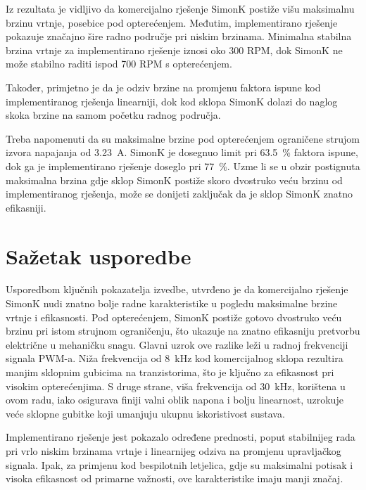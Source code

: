 \documentclass[diplomskirad]{fer}
\begin{document}
Iz rezultata je vidljivo da komercijalno rješenje SimonK postiže višu
maksimalnu brzinu vrtnje, posebice pod opterećenjem. Međutim, implementirano
rješenje pokazuje značajno šire radno područje pri niskim brzinama. Minimalna
stabilna brzina vrtnje za implementirano rješenje iznosi oko 300 RPM, dok
SimonK ne može stabilno raditi ispod 700 RPM s opterećenjem.

Također, primjetno je da je odziv brzine na promjenu faktora ispune kod
implementiranog rješenja linearniji, dok kod sklopa SimonK dolazi do naglog
skoka brzine na samom početku radnog područja.

Treba napomenuti da su maksimalne brzine pod opterećenjem ograničene strujom
izvora napajanja od \SI{3.23}{\ampere}. SimonK je dosegnuo limit pri
\SI{63.5}{\%} faktora ispune, dok ga je implementirano rješenje doseglo pri
\SI{77}{\%}. Uzme li se u obzir postignuta maksimalna brzina gdje sklop SimonK
postiže skoro dvostruko veću brzinu od implementiranog rješenja, može se
donijeti zaključak da je sklop SimonK znatno efikasniji.

\section{Sažetak usporedbe}

\label{sec:sazetak_usporedbe}

Usporedbom ključnih pokazatelja izvedbe, utvrđeno je da komercijalno rješenje
SimonK nudi znatno bolje radne karakteristike u pogledu maksimalne brzine
vrtnje i efikasnosti. Pod opterećenjem, SimonK postiže gotovo dvostruko veću
brzinu pri istom strujnom ograničenju, što ukazuje na znatno efikasniju
pretvorbu električne u mehaničku snagu. Glavni uzrok ove razlike leži u radnoj
frekvenciji signala PWM-a. Niža frekvencija od \SI{8}{\kilo\hertz} kod
komercijalnog sklopa rezultira manjim sklopnim gubicima na tranzistorima, što
je ključno za efikasnost pri visokim opterećenjima. S druge strane, viša
frekvencija od \SI{30}{\kilo\hertz}, korištena u ovom radu, iako osigurava
finiji valni oblik napona i bolju linearnost, uzrokuje veće sklopne gubitke
koji umanjuju ukupnu iskoristivost sustava.

Implementirano rješenje jest pokazalo određene prednosti, poput stabilnijeg
rada pri vrlo niskim brzinama vrtnje i linearnijeg odziva na promjenu
upravljačkog signala. Ipak, za primjenu kod bespilotnih letjelica, gdje su
maksimalni potisak i visoka efikasnost od primarne važnosti, ove karakteristike
imaju manji značaj.
\end{document}
